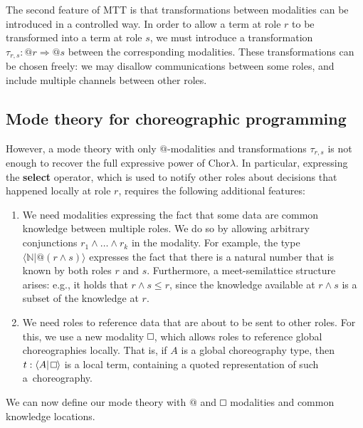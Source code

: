 \documentclass{scrartcl}
\renewcommand{\square}{\mathop{\mathchoice%
  {\tikz{\draw (0,0) rectangle (0.2cm,0.2cm);}}%
  {\tikz{\draw (0,0) rectangle (0.2cm,0.2cm);}}%
  {\tikz{\draw (0,0) rectangle (0.15cm,0.15cm);}}%
  {\tikz{\draw (0,0) rectangle (0.10cm,0.10cm);}}}}
\theoremstyle{definition}
\theoremstyle{plain}
\begin{document}
The second feature of MTT is that transformations between modalities can be
introduced in a controlled way. In order to allow a term at role $r$ to be
transformed into a term at role $s$, we must introduce a transformation
$\tau_{r,s} : @r \Rightarrow @s$ between the corresponding modalities. These
transformations can be chosen freely: we may disallow communications between
some roles, and include multiple channels between other roles.



\subsection{Mode theory for choreographic programming}
However, a mode theory with only $@$-modalities and transformations
$\tau_{r,s}$ is not enough to recover the full expressive power of
Chor$\lambda$. In particular, expressing the \textbf{select} operator, which is
used to notify other roles about decisions that happened locally at role $r$,
requires the following additional features:
\begin{enumerate}
\item
  We need modalities expressing the fact that some data are common knowledge
  between multiple roles. We do so by allowing arbitrary conjunctions $r_1
  \land \ldots \land r_k$ in the modality. For example, the type $\langle
  \mathbb{N} | @(r\land s) \rangle$ expresses the fact that there is a natural
  number that is known by both roles $r$ and $s$. Furthermore, a
  meet-semilattice structure arises: e.g., it holds that $r \land s \leq r$,
  since the knowledge available at $r \land s$ is a subset of the knowledge at
  $r$.
\item
  We need roles to reference data that are about to be sent to other roles. For
  this, we use a new modality $\square$, which allows roles to reference global
  choreographies locally. That is, if $A$ is a global choreography type, then
  $t : \langle A | \square \rangle$ is a local term, containing a quoted
  representation of such a~choreography.
\end{enumerate}
We can now define our mode theory with $@$ and $\square$ modalities and common
knowledge locations.
\end{document}
